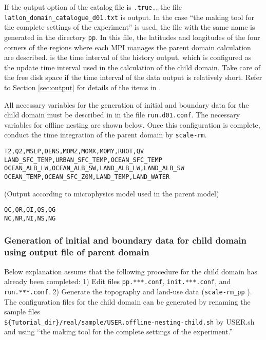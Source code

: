 If the output option of the catalog file is \verb|.true.|, the file \verb|latlon_domain_catalogue_d01.txt| is output. In the case ``the making tool for the complete settings of the experiment'' is used, the file with the same name is generated in the directory \verb|pp|. In this file, the latitudes and longitudes of the four corners of the regions where each MPI manages the parent domain calculation are described.  is the time interval of the history output,  which is configured as the update time interval used in the calculation of the child domain. Take care of the free disk space if the time interval of the data output is relatively short. Refer to Section \ref{sec:output} for details of the items in .

All necessary variables for the generation of initial and boundary data for the child domain must be described  in  in the file \verb|run.d01.conf|. The necessary variables for offline nesting are shown below. Once this configuration is complete, conduct the time integration of the parent domain by \verb|scale-rm|.
\begin{alltt}
  T2, Q2, MSLP, DENS, MOMZ, MOMX, MOMY, RHOT, QV
  LAND_SFC_TEMP, URBAN_SFC_TEMP, OCEAN_SFC_TEMP
  OCEAN_ALB_LW, OCEAN_ALB_SW, LAND_ALB_LW, LAND_ALB_SW
  OCEAN_TEMP, OCEAN_SFC_Z0M, LAND_TEMP, LAND_WATER
\end{alltt}
(Output according to microphysics model used in the parent model)
\begin{alltt}
  QC, QR, QI, QS, QG
  NC, NR, NI, NS, NG
\end{alltt}

\subsubsection{Generation of initial and boundary data for child domain using output file of parent domain}

Below explanation assums that the following procedure for the child domain has already been completed:
1) Edit files \verb|pp.***.conf|, \verb|init.***.conf|, and \verb|run.***.conf|.
2) Generate the topography and land-use data (\verb|scale-rm_pp| ).
The configuration files for the child domain can be generated by renaming the sample files \\ \verb|${Tutorial_dir}/real/sample/USER.offline-nesting-child.sh| by USER.sh and using ``the making tool for the complete settings of the experiment.''

